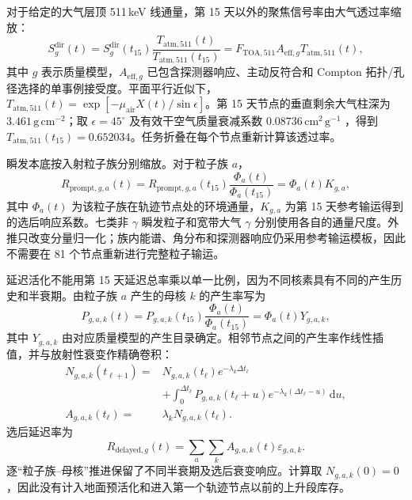 \documentclass[11pt]{article}
\begin{document}
对于给定的大气层顶 511\,keV 线通量，第 15 天以外的聚焦信号率由大气透过率缩放：
\begin{equation}
 S^{\mathrm{dir}}_g(t)
 =S^{\mathrm{dir}}_g(t_{15})
 \frac{T_{\mathrm{atm},511}(t)}{T_{\mathrm{atm},511}(t_{15})}
 =F_{\mathrm{TOA},511}A_{\mathrm{eff},g}T_{\mathrm{atm},511}(t),
 \label{eq:mission_signal_zh}
\end{equation}
其中 $g$ 表示质量模型，$A_{\mathrm{eff},g}$ 已包含探测器响应、主动反符合和 Compton 拓扑/孔径选择的单事例接受度。平面平行近似下，$T_{\mathrm{atm},511}(t)=\exp[-\mu_{\mathrm{air}}X(t)/\sin\epsilon]$。第 15 天节点的垂直剩余大气柱深为 $3.461\,\mathrm{g\,cm^{-2}}$；取 $\epsilon=45^\circ$ 及有效干空气质量衰减系数 $0.08736\,\mathrm{cm^2\,g^{-1}}$ \cite{NISTXCOM}，得到 $T_{\mathrm{atm},511}(t_{15})=0.652034$。任务折叠在每个节点重新计算该透过率。

瞬发本底按入射粒子族分别缩放。对于粒子族 $a$，
\begin{equation}
 R_{\mathrm{prompt},g,a}(t)
 =R_{\mathrm{prompt},g,a}(t_{15})
 \frac{\Phi_a(t)}{\Phi_a(t_{15})}
 =\Phi_a(t)K_{g,a},
 \label{eq:prompt_source_response_zh}
\end{equation}
其中 $\Phi_a(t)$ 为该粒子族在轨迹节点处的环境通量，$K_{g,a}$ 为第 15 天参考输运得到的选后响应系数。七类非 $\gamma$ 瞬发粒子和宽带大气 $\gamma$ 分别使用各自的通量尺度。外推只改变分量归一化；族内能谱、角分布和探测器响应仍采用参考输运模板，因此不需要在 81 个节点重新进行完整粒子输运。

延迟活化不能用第 15 天延迟总率乘以单一比例，因为不同核素具有不同的产生历史和半衰期。由粒子族 $a$ 产生的母核 $k$ 的产生率写为
\begin{equation}
 P_{g,a,k}(t)
 =P_{g,a,k}(t_{15})\frac{\Phi_a(t)}{\Phi_a(t_{15})}
 =\Phi_a(t)Y_{g,a,k},
 \label{eq:activation_production_zh}
\end{equation}
其中 $Y_{g,a,k}$ 由对应质量模型的产生目录确定。相邻节点之间的产生率作线性插值，并与放射性衰变作精确卷积：
\begin{equation}
 \begin{aligned}
 N_{g,a,k}(t_{\ell+1})={}&N_{g,a,k}(t_\ell)e^{-\lambda_k\Delta t_\ell}\\
 &+\int_0^{\Delta t_\ell}P_{g,a,k}(t_\ell+u)
 e^{-\lambda_k(\Delta t_\ell-u)}\,\mathrm du,\\
 A_{g,a,k}(t_\ell)={}&\lambda_kN_{g,a,k}(t_\ell).
 \end{aligned}
 \label{eq:delayed_inventory_zh}
\end{equation}
选后延迟率为
\begin{equation}
 R_{\mathrm{delayed},g}(t)=
 \sum_a\sum_kA_{g,a,k}(t)\varepsilon_{g,a,k}.
 \label{eq:delayed_selected_zh}
\end{equation}
逐“粒子族--母核”推进保留了不同半衰期及选后衰变响应。计算取 $N_{g,a,k}(0)=0$，因此没有计入地面预活化和进入第一个轨迹节点以前的上升段库存。
\end{document}
